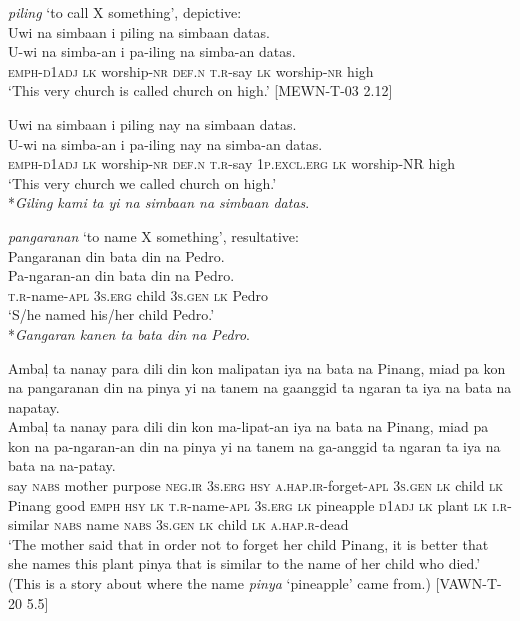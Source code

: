 \ea
\textit{piling} ‘to call X something’, depictive: \\
Uwi	na	simbaan	i	piling	na	simbaan	datas. \\\smallskip
\gll U-wi	na	simba-an	i	pa-iling	na	simba-an	datas. \\
\textsc{emph-d1adj}	\textsc{lk}	worship-\textsc{nr}	\textsc{def.n}	\textsc{t.r}-say	\textsc{lk}	worship-\textsc{nr}	high \\
\glt ‘This very church is called church on high.’ [MEWN-T-03 2.12]
\z

\ea
Uwi	na	simbaan	i	piling	nay	na	simbaan	datas. \\\smallskip
\gll U-wi	na	simba-an	i	pa-iling	nay	na	simba-an	datas. \\
\textsc{emph-d1adj}	\textsc{lk}	worship-\textsc{nr}	\textsc{def.n}	\textsc{t.r}-say	1\textsc{p.excl.erg}	\textsc{lk}	worship-NR	high \\
\glt ‘This very church we called church on high.’ \\\smallskip
*\textit{Giling kami ta yi na simbaan na simbaan datas}.
\z

\ea
\textit{pangaranan} ‘to name X something’, resultative: \\
Pangaranan	din	bata	din	na	Pedro. \\\smallskip
\gll Pa-ngaran-an	din	bata	din	na	Pedro. \\
\textsc{t.r}-name-\textsc{apl}	3\textsc{s.erg}	child	3\textsc{s.gen}	\textsc{lk}	Pedro \\
\glt ‘S/he named his/her child Pedro.’ \\\smallskip
*\textit{Gangaran kanen ta bata din na Pedro}.
\z

\ea
Ambaļ	ta	nanay	para	dili	din	kon	malipatan	iya	na bata	na	Pinang,	miad	pa	kon	na	pangaranan	din	na	pinya yi	na	tanem	na	gaanggid	ta	ngaran	ta	iya	na	bata	na	napatay. \\\smallskip
\gll Ambaļ	ta	nanay	para	dili	din	kon	ma-lipat-an	iya	na bata	na	Pinang,	miad	pa	kon	na	pa-ngaran-an	din	na	pinya yi	na	tanem	na	ga-anggid	ta	ngaran	ta	iya	na	bata	na	na-patay. \\
say	\textsc{nabs}	mother	purpose	\textsc{neg.ir}	3\textsc{s.erg}	\textsc{hsy}	\textsc{a.hap.ir}-forget-\textsc{apl}	3\textsc{s.gen}	\textsc{lk} child	\textsc{lk}	Pinang	good	\textsc{emph}	\textsc{hsy}	\textsc{lk}	\textsc{t.r}-name-\textsc{apl}	3\textsc{s.erg}	\textsc{lk}	pineapple \textsc{d1adj}	\textsc{lk}	plant	\textsc{lk}	\textsc{i.r}-similar	\textsc{nabs}	name	\textsc{nabs}	3\textsc{s.gen}	\textsc{lk}	child	\textsc{lk}	\textsc{a.hap.r}-dead \\
\glt ‘The mother said that in order not to forget her child Pinang, it is better that she names this plant pinya that is similar to the name of her child who died.’ (This is a story about where the name \textit{pinya} ‘pineapple’ came from.) [VAWN-T-20 5.5]
\z

